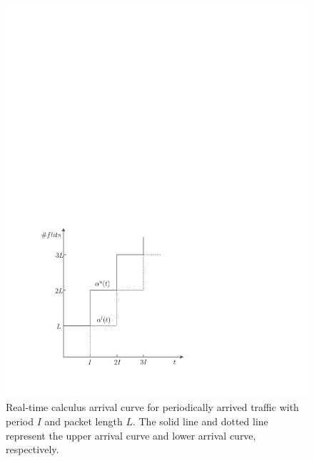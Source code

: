 \documentclass[10pt,journal]{IEEEtran}
\begin{document}
\begin{figure}
  \centering
  \includegraphics[scale=0.5]{figures/AC.pdf}
  \caption{Real-time calculus arrival curve for periodically arrived traffic with period $I$ and packet length $L$. The solid line and dotted line represent the upper arrival curve and lower arrival curve, respectively.}\label{ac}
\end{figure}
\end{document}
